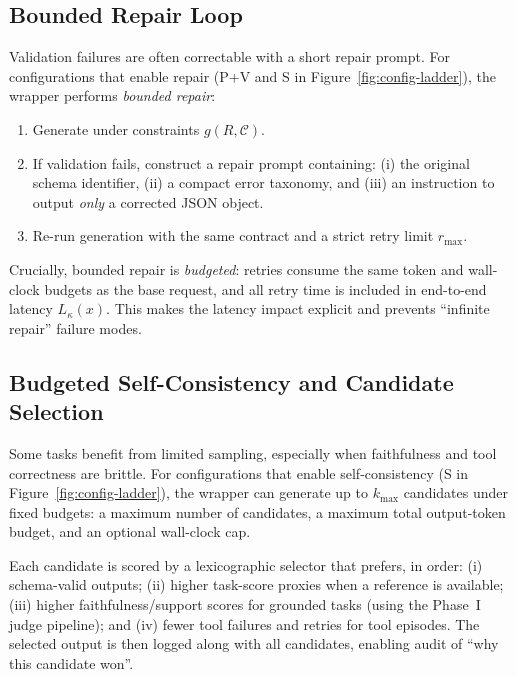 \documentclass[11pt]{article}
\begin{document}
\subsection{Bounded Repair Loop}
\label{sec:method-retry}

Validation failures are often correctable with a short repair prompt.
For configurations that enable repair (P+V and S in Figure~\ref{fig:config-ladder}), the wrapper performs \emph{bounded repair}:

\begin{enumerate}[leftmargin=12pt]
    \item Generate under constraints $g(R,\mathcal{C})$.
    \item If validation fails, construct a repair prompt containing:
    (i) the original schema identifier,
    (ii) a compact error taxonomy, and
    (iii) an instruction to output \emph{only} a corrected JSON object.
    \item Re-run generation with the same contract and a strict retry limit $r_{\max}$.
\end{enumerate}

Crucially, bounded repair is \emph{budgeted}: retries consume the same token and wall-clock budgets as the base request, and all retry time is included in end-to-end latency $L_\kappa(x)$.
This makes the latency impact explicit and prevents ``infinite repair'' failure modes.

\subsection{Budgeted Self-Consistency and Candidate Selection}

Some tasks benefit from limited sampling, especially when faithfulness and tool correctness are brittle.
For configurations that enable self-consistency (S in Figure~\ref{fig:config-ladder}), the wrapper can generate up to $k_{\max}$ candidates under fixed budgets:
a maximum number of candidates, a maximum total output-token budget, and an optional wall-clock cap.

Each candidate is scored by a lexicographic selector that prefers, in order:
(i) schema-valid outputs;
(ii) higher task-score proxies when a reference is available;
(iii) higher faithfulness/support scores for grounded tasks (using the Phase~I judge pipeline);
and (iv) fewer tool failures and retries for tool episodes.
The selected output is then logged along with all candidates, enabling audit of ``why this candidate won''.
\end{document}
